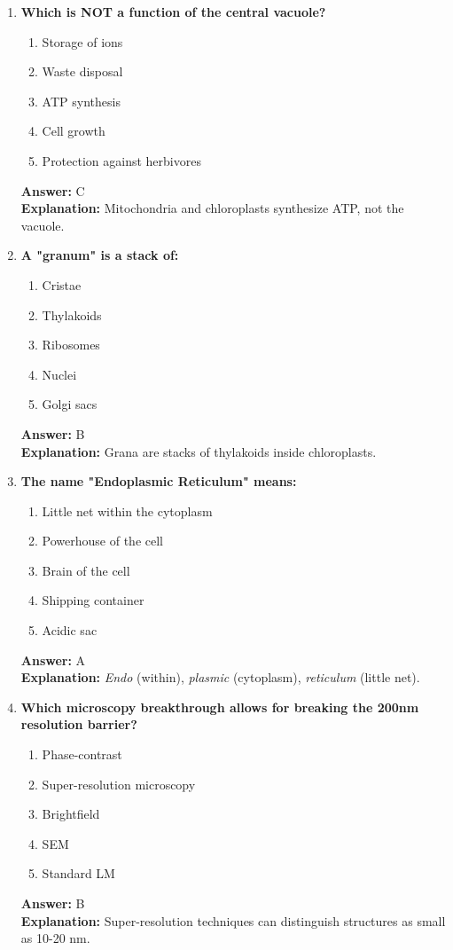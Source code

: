 \documentclass[11pt, a4paper]{article}
\begin{document}
\begin{enumerate}[leftmargin=*, label=\arabic*.]
\item \textbf{Which is NOT a function of the central vacuole?}
\begin{enumerate}[label=\Alph*.]
\item Storage of ions
\item Waste disposal
\item ATP synthesis
\item Cell growth
\item Protection against herbivores
\end{enumerate}
\textbf{Answer:} C \\
\textbf{Explanation:} Mitochondria and chloroplasts synthesize ATP, not the vacuole.

\item \textbf{A "granum" is a stack of:}
\begin{enumerate}[label=\Alph*.]
\item Cristae
\item Thylakoids
\item Ribosomes
\item Nuclei
\item Golgi sacs
\end{enumerate}
\textbf{Answer:} B \\
\textbf{Explanation:} Grana are stacks of thylakoids inside chloroplasts.

\item \textbf{The name "Endoplasmic Reticulum" means:}
\begin{enumerate}[label=\Alph*.]
\item Little net within the cytoplasm
\item Powerhouse of the cell
\item Brain of the cell
\item Shipping container
\item Acidic sac
\end{enumerate}
\textbf{Answer:} A \\
\textbf{Explanation:} \textit{Endo} (within), \textit{plasmic} (cytoplasm), \textit{reticulum} (little net).

\item \textbf{Which microscopy breakthrough allows for breaking the 200nm resolution barrier?}
\begin{enumerate}[label=\Alph*.]
\item Phase-contrast
\item Super-resolution microscopy
\item Brightfield
\item SEM
\item Standard LM
\end{enumerate}
\textbf{Answer:} B \\
\textbf{Explanation:} Super-resolution techniques can distinguish structures as small as 10-20 nm.


\end{enumerate}
\end{document}
